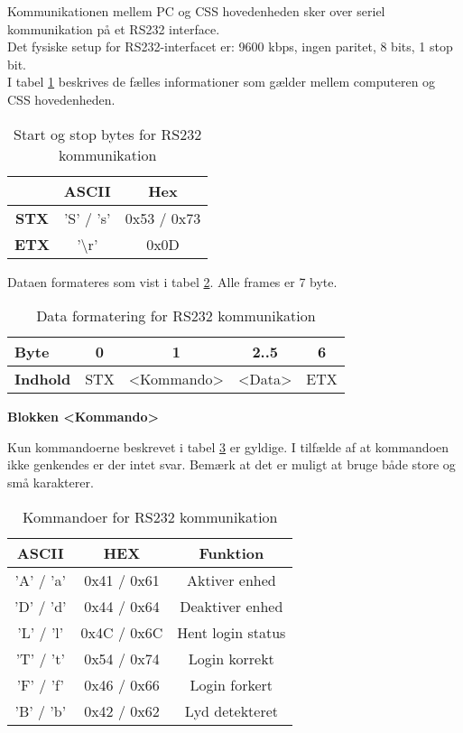 Kommunikationen mellem PC og CSS hovedenheden sker over seriel kommunikation på et RS232 interface.\\

Det fysiske setup for RS232-interfacet er: 9600 kbps, ingen paritet, 8 bits, 1 stop bit.\\

I tabel \ref{table:RS232StartStopBytes} beskrives de fælles informationer som gælder mellem computeren og CSS hovedenheden.\\

\begin{table}[h]
	\caption{Start og stop bytes for RS232 kommunikation}
	\centering
	\begin{tabular}{|c|c|c|}
		\hline 
		& \textbf{ASCII} & \textbf{Hex} \\ 
		\hline 
		\textbf{STX} & 'S' / 's' & 0x53 / 0x73 \\ 
		\hline 
		\textbf{ETX} & '\textbackslash r' & 0x0D \\ 
		\hline 
	\end{tabular} 
	\label{table:RS232StartStopBytes}
\end{table}


Dataen formateres som vist i tabel \ref{table:RS232DataFormat}. Alle frames er 7 byte.

\begin{table}[h]
	\caption{Data formatering for RS232 kommunikation}
	\centering
	\begin{tabular}{|l|c|c|c|c|}
		\hline 
		\textbf{Byte} & 0 & 1 & 2..5 & 6 \\ 
		\hline 
		\textbf{Indhold} & STX & <Kommando> & <Data> & ETX \\ 
		\hline 
	\end{tabular} 
	\label{table:RS232DataFormat}
\end{table}

\textbf{Blokken <Kommando>}

Kun kommandoerne beskrevet i tabel \ref{tabel:RS232Kommandoer} er gyldige. I tilfælde af at kommandoen ikke genkendes er der intet svar. Bemærk at det er muligt at bruge både store og små karakterer.\\

\begin{table}[h]
\caption{Kommandoer for RS232 kommunikation}
\centering
\begin{tabular}{|c|c|c|}
\hline 
\textbf{ASCII} & \textbf{HEX} & \textbf{Funktion} \\ 
\hline 
'A' / 'a' & 0x41 / 0x61 & Aktiver enhed \\ 
\hline 
'D' / 'd' & 0x44 / 0x64 & Deaktiver enhed \\ 
\hline 
'L' / 'l' & 0x4C / 0x6C & Hent login status \\ 
\hline 
'T' / 't' & 0x54 / 0x74 & Login korrekt \\ 
\hline 
'F' / 'f' & 0x46 / 0x66 & Login forkert \\ 
\hline
'B' / 'b' & 0x42 / 0x62 & Lyd detekteret \\ 
\hline
\end{tabular}
\label{tabel:RS232Kommandoer}
\end{table} 

